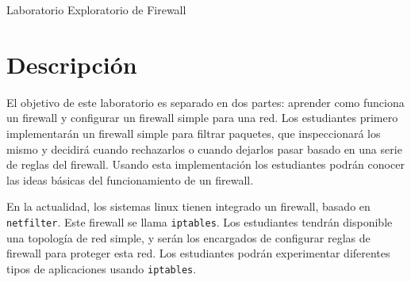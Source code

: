 
\newcommand{\commonfolder}{../../common-files}




\newcommand{\telnet} {\texttt{telnet}\xspace}
\newcommand{\iptables}{\texttt{iptables}\xspace}
\newcommand{\netfilter}{\texttt{netfilter}\xspace}
\newcommand{\Netfilter}{\texttt{Netfilter}\xspace}

\newcommand{\firewallFigs}{./Figs}

\newcommand{\pointleft}[1]{\reflectbox{\ding{217}} \textbf{\texttt{#1}}}



\begin{center}
{\LARGE Laboratorio Exploratorio de Firewall}
\end{center}




\section{Descripción}

El objetivo de este laboratorio es separado en dos partes: aprender como funciona un firewall y configurar un firewall simple para una red. Los estudiantes primero implementarán un firewall simple para filtrar paquetes, que inspeccionará los mismo y decidirá cuando rechazarlos o cuando dejarlos pasar basado en una serie de reglas del firewall.
Usando esta implementación los estudiantes podrán conocer las ideas básicas del funcionamiento de un firewall.

En la actualidad, los sistemas linux tienen integrado un firewall, basado en \texttt{netfilter}. Este firewall se llama \iptables. 
Los estudiantes tendrán disponible una topología de red simple, y serán los encargados de configurar reglas de firewall para proteger esta red.
Los estudiantes podrán experimentar diferentes tipos de aplicaciones usando \iptables. 

